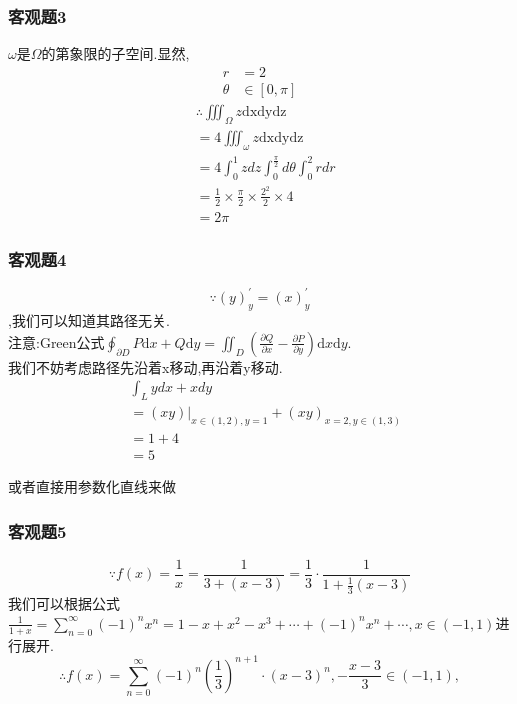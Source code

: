 \documentclass[a4paper,12pt]{ctexrep}
\begin{document}
\subsubsection{客观题3}
\setcounter{counter1}{1}
$\omega$是$\Omega$的第象限的子空间.显然,$$\begin{aligned}r&=2\\\theta&\in[0,\pi]\end{aligned}$$
\begin{equation*}
	 \begin{aligned}& \therefore \iiint_{\Omega}z\mathrm{dxdydz} \\&
 =4\iiint_{\omega}z\mathrm{dxdydz} \\&
 =4\int_{0}^{1}zdz\int_{0}^{\frac{\pi}{2}}d\theta\int_{0}^{2}rdr\\&
	=\frac{1}{2}\times\frac{\pi}{2}\times\frac{2^{2}}{2}\times4\\&
	=2\pi\end{aligned}
\end{equation*}

\subsubsection{客观题4}
$$\because(y)^{\prime}_y=(x)^{\prime}_y$$,我们可以知道其路径无关. \\
注意:Green公式$\oint_{\partial D}P\mathrm{d}x+Q\mathrm{d}y=\iint_{D}\left(\frac{\partial Q}{\partial x}-\frac{\partial P}{\partial y}\right)\mathrm{d}x\mathrm{d}y$. \\
我们不妨考虑路径先沿着x移动,再沿着y移动.
\begin{equation*}
\begin{aligned}&\int_{L}ydx+xdy\\&
	=(xy)|_{x\in(1,2),y=1}+(xy)_{x=2,y\in(1,3)}\\&
	=1+4\\&
	=5\end{aligned}
\end{equation*}

或者直接用参数化直线来做

\subsubsection{客观题5}
$$ \because f(x)=\frac{1}{x}=\frac{1}{3+(x-3)}=\frac{1}{3}\cdot\frac{1}{1+\frac{1}{3}(x-3)} $$
我们可以根据公式$\frac{1}{1+x}=\sum_{n=0}^\infty(-1)^nx^n=1-x+x^2-x^3+\cdots+(-1)^nx^n+\cdots,x\in(-1,1)$进行展开. 
$$ \therefore f(x) = \sum_{n=0}^\infty
(-1)^{n} (\frac{1}{3})^{n+1} \cdot (x-3)^{n}  ,-\frac{x-3}{3}\in(-1,1),$$ 
\end{document}
